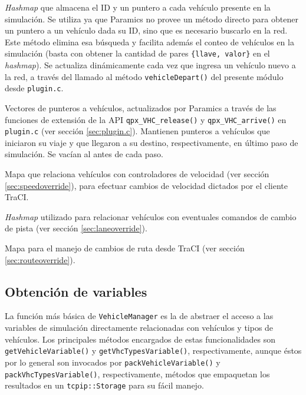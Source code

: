 \begin{description}[]
    \item[\texttt{vehicles\_in\_sim}] \emph{Hashmap} que almacena el ID y un puntero a cada vehículo presente en la simulación. Se utiliza ya que Paramics no provee un método directo para obtener un puntero a un vehículo dada su ID, sino que es necesario buscarlo en la red. Este método elimina esa búsqueda y facilita además el conteo de vehículos en la simulación (basta con obtener la cantidad de pares \texttt{\{llave, valor\}} en el \emph{hashmap}). Se actualiza dinámicamente cada vez que ingresa un vehículo nuevo a la red, a través del llamado al método \texttt{vehicleDepart()} del presente módulo desde \texttt{plugin.c}.
    
    \item[\texttt{departed\_vehicles} y \texttt{arrived\_vehicles}] Vectores de punteros a vehículos, actualizados por Paramics a través de las funciones de extensión de la API \texttt{qpx\_VHC\_release()} y \texttt{qpx\_VHC\_arrive()} en \texttt{plugin.c} (ver sección \ref{sec:plugin.c}). Mantienen punteros a vehículos que iniciaron su viaje y que llegaron a su destino, respectivamente, en último paso de simulación. Se vacían al antes de cada paso.
    
    \item[\texttt{speed\_controllers}] Mapa que relaciona vehículos con controladores de velocidad (ver sección \ref{sec:speedoverride}), para efectuar cambios de velocidad dictados por el cliente TraCI.
    
    \item[\texttt{lane\_set\_triggers}] \emph{Hashmap} utilizado para relacionar vehículos con eventuales comandos de cambio de pista (ver sección \ref{sec:laneoverride}).
    
    \item [\texttt{vhc\_routes}] Mapa para el manejo de cambios de ruta desde TraCI (ver sección \ref{sec:routeoverride}).
\end{description}

\subsection{Obtención de variables}

La función más básica de \texttt{VehicleManager} es la de abstraer el acceso a las variables de simulación directamente relacionadas con vehículos y tipos de vehículos. Los principales métodos encargados de estas funcionalidades son \texttt{getVehicleVariable()} y \texttt{getVhcTypesVariable()}, respectivamente, aunque éstos por lo general son invocados por \texttt{packVehicleVariable()} y \texttt{packVhcTypesVariable()}, respectivamente, métodos que empaquetan los resultados en un \texttt{tcpip::Storage} para su fácil manejo. 

